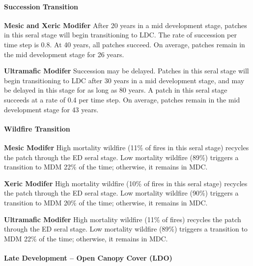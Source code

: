 \paragraph{Succession Transition}
\begin{adjustwidth}{2cm}{}
\textbf{Mesic and Xeric Modifer } After 20 years in a mid development stage, patches in this seral stage will begin transitioning to LDC. The rate of succession per time step is 0.8. At 40 years, all patches succeed. On average, patches remain in the mid development stage for 26 years.

\medskip
\noindent \textbf{Ultramafic Modifer} Succession may be delayed. Patches in this seral stage will begin transitioning to LDC after 30 years in a mid development stage, and may be delayed in this stage for as long as 80 years. A patch in this seral stage succeeds at a rate of 0.4 per time step. On average, patches remain in the mid development stage for 43 years.

\end{adjustwidth}
\paragraph{Wildfire Transition}
\begin{adjustwidth}{2cm}{}
\textbf{Mesic Modifer } High mortality wildfire (11\% of fires in this seral stage) recycles the patch through the ED seral stage. Low mortality wildfire (89\%) triggers a transition to MDM 22\% of the time; otherwise, it remains in MDC.

\medskip
\noindent \textbf{Xeric Modifer} High mortality wildfire (10\% of fires in this seral stage) recycles the patch through the ED seral stage. Low mortality wildfire (90\%) triggers a transition to MDM 20\% of the time; otherwise, it remains in MDC.

\medskip
\noindent \textbf{Ultramafic Modifer} High mortality wildfire (11\% of fires) recycles the patch through the ED seral stage. Low mortality wildfire (89\%) triggers a transition to MDM 22\% of the time; otherwise, it remains in MDC.

\end{adjustwidth}
\noindent\hrulefill


\paragraph{Late Development – Open Canopy Cover (LDO)}


